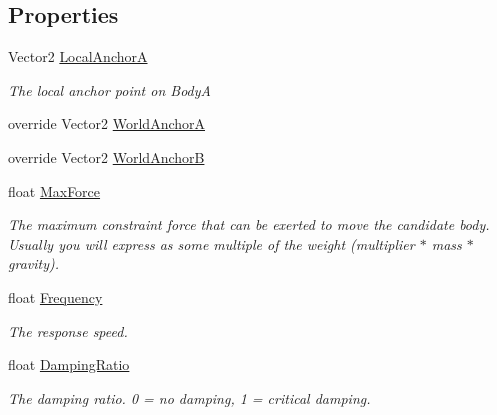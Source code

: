 \subsection*{Properties}
\begin{DoxyCompactItemize}
\item 
Vector2 \hyperlink{class_farseer_physics_1_1_dynamics_1_1_joints_1_1_fixed_mouse_joint_a66919599e7b6d25f4fec6cc94b4f6a20}{Local\+Anchor\+A}
\begin{DoxyCompactList}\small\item\em The local anchor point on Body\+A \end{DoxyCompactList}\item 
override Vector2 \hyperlink{class_farseer_physics_1_1_dynamics_1_1_joints_1_1_fixed_mouse_joint_a54c1f2aef9425006b3ed6345d72a67d8}{World\+Anchor\+A}
\item 
override Vector2 \hyperlink{class_farseer_physics_1_1_dynamics_1_1_joints_1_1_fixed_mouse_joint_a65b1f1ec7c9ef075ea581311eb1b6cf1}{World\+Anchor\+B}
\item 
float \hyperlink{class_farseer_physics_1_1_dynamics_1_1_joints_1_1_fixed_mouse_joint_a15679214ccd9400ab18e4eb99237926a}{Max\+Force}
\begin{DoxyCompactList}\small\item\em The maximum constraint force that can be exerted to move the candidate body. Usually you will express as some multiple of the weight (multiplier $\ast$ mass $\ast$ gravity). \end{DoxyCompactList}\item 
float \hyperlink{class_farseer_physics_1_1_dynamics_1_1_joints_1_1_fixed_mouse_joint_a44b8d829d42c0a2c057ab0671ef0fd83}{Frequency}
\begin{DoxyCompactList}\small\item\em The response speed. \end{DoxyCompactList}\item 
float \hyperlink{class_farseer_physics_1_1_dynamics_1_1_joints_1_1_fixed_mouse_joint_a311969f45e435d7547b30c5adb8d4289}{Damping\+Ratio}
\begin{DoxyCompactList}\small\item\em The damping ratio. 0 = no damping, 1 = critical damping. \end{DoxyCompactList}\end{DoxyCompactItemize}
